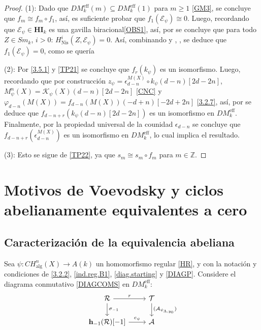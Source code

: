 \documentclass[10pt]{amsart}
\theoremstyle{definition}
\theoremstyle{remark}
\theoremstyle{definition}
\begin{document}
\begin{proof}
(1): Dado que $DM^{\mathrm{eff}}_{k}(m)\subseteq DM^{\mathrm{eff}}_{k}(1)$ para $m\geq 1$ \ref{GM3}, se concluye que $f_{m}\cong f_{m}\circ f_{1}$, así, es suficiente probar que $f_{1}(\mathcal{E}_{\psi})\cong 0$. Luego, recordando que $\mathcal{E}_{\psi}\in\mathbf{HI}_{k}$ es una gavilla biracional\ref{OBS1}, así, por \cite[Thm. 5.7]{Voe00a} se concluye que para todo $Z\in Sm_{k}$, $i>0$: $H^{i}_{\mathrm{Nis}}(Z,\mathcal{E}_{\psi})=0$. Así, combinando \cite[Cor. 4.5.3 and Lem. 4.5.4]{KS17} y \cite[Lem. 5.9]{Voe10b}, \cite[Prop. 1.1]{HK06}, se deduce que $f_{1}(\mathcal{E}_{\psi})=0$, como se quería

(2): Por \ref{3.5.1} y \ref{TP21} se concluye que $f_{r}(k_{\psi})$ es un isomorfismo. Luego, recordando que por construcción $z_{\psi}=\epsilon_{d-n}^{M(X)}\circ k_{\psi}(d-n)[2d-2n]$, $M^{n}_{\psi}(X)=\mathcal{K}_{\psi}(X)(d-n)[2d-2n]$ \ref{CNC} y $\varphi_{d-n}(M(X))=f_{d-n}(M(X))(-d+n)[-2d+2n]$ \ref{3.2.7}, así, por \cite[3.3.3(2)]{Pel17} se deduce que $f_{d-n+r}(k_{\psi}(d-n)[2d-2n])$ es un isomorfismo en $DM^{\mathrm{eff}}_{k}$. Finalmente, por la propiedad universal de la counidad $\epsilon_{d-n}$ \cite[3.3.1]{Pel17} se concluye que $f_{d-n+r}(\epsilon_{d-n}^{M(X)})$ es un isomorfismo en $DM^{\mathrm{eff}}_{k}$, lo cual implica el resultado.

(3): Esto se sigue de \ref{TP22}, ya que $s_{m}\cong s_{m}\circ f_{m}$ para $m\in\mathbb{Z}$.
\end{proof}

\section{Motivos de Voevodsky y ciclos abelianamente equivalentes a cero}\label{MVEA}

\subsection{Caracterización de la equivalencia abeliana}\label{EA1}

Sea $\psi:CH^{n}_{\mathrm{alg}}(X)\to A(k)$ un homomorfismo regular \ref{HR}, y con la notación y condiciones de \ref{3.2.2},  \ref{ind.reg.B1}, \ref{diag.starting} y  \ref{DIAGP}. Considere el diagrama conmutativo \ref{DIAGCOMS} en $DM^{\mathrm{eff}}_{k}$:
\begingroup{}\label{DIAC}
\[
\begin{tikzcd}
\mathcal{R}\arrow[r, "r"]\arrow[d, "\sigma_{-1}"] & \mathcal{T}\arrow[d, "(\mathcal{A}_{\psi_{\Lambda,y_{0}}})"] \\
\mathbf{h}_{-1}(\mathcal{R})[-1]\arrow[r, "e_{\psi}"] & \mathcal{A}
\end{tikzcd}
\]
\endgroup
\end{document}
